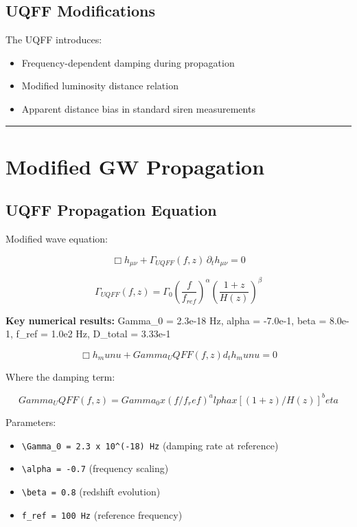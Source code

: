 \documentclass[12pt,a4paper]{article}
\begin{document}
\subsection{UQFF Modifications}

The UQFF introduces:

\begin{itemize}
  \item Frequency-dependent damping during propagation
  \item Modified luminosity distance relation
  \item Apparent distance bias in standard siren measurements
\end{itemize}

\medskip\hrule\medskip

\section{Modified GW Propagation}

\subsection{UQFF Propagation Equation}

Modified wave equation:

\begin{equation}
\Box h_{\mu\nu} + \Gamma_{UQFF}(f,z)\,\partial_t h_{\mu\nu} = 0
\end{equation}

\begin{equation}
\Gamma_{UQFF}(f,z) = \Gamma_0 \left(\frac{f}{f_{ref}}\right)^{\alpha} \left(\frac{1+z}{H(z)}\right)^{\beta}
\end{equation}

\textbf{Key numerical results:} Gamma\_0 = 2.3e-18 Hz, alpha = -7.0e-1, beta = 8.0e-1, f\_ref = 1.0e2 Hz, D\_total = 3.33e-1

\begin{equation}
\Box h_munu + Gamma_UQFF(f,z) d_t h_munu = 0
\end{equation}

Where the damping term:

\begin{equation}
Gamma_UQFF(f,z) = Gamma_0 x (f/f_ref)^alpha x [(1+z)/H(z)]^beta
\end{equation}

Parameters:

\begin{itemize}
  \item \texttt{\textbackslash Gamma\_0 = 2.3 x 10\^{}(-18) Hz} (damping rate at reference)
  \item \texttt{\textbackslash alpha = -0.7} (frequency scaling)
  \item \texttt{\textbackslash beta = 0.8} (redshift evolution)
  \item \texttt{f\_ref = 100 Hz} (reference frequency)
\end{itemize}
\end{document}
